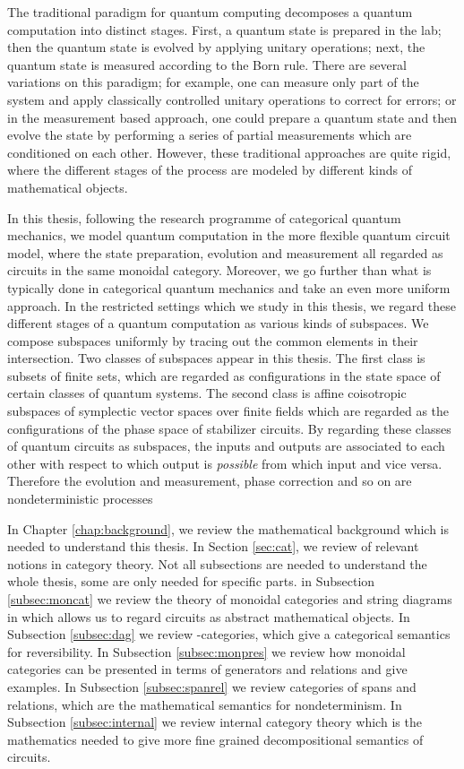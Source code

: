 
The traditional paradigm for quantum computing decomposes a quantum computation into  distinct stages. First, a quantum state is prepared in the lab; then the quantum state is evolved by applying unitary operations; next, the quantum state is measured according to the Born rule.  There are several variations on this paradigm; for example,  one can measure only part of the system and apply classically controlled unitary operations to correct for errors; or in the measurement based approach, one could prepare a quantum state and then evolve the state by performing a series of partial measurements which are conditioned on each other. However, these traditional approaches are quite rigid, where the different stages of the process are modeled by different kinds of mathematical objects.  %

In this thesis, following the research programme of categorical quantum mechanics, we model quantum computation in the more flexible quantum circuit model, where the state preparation, evolution and measurement all regarded as circuits in the same monoidal category. Moreover, we go further than what is typically done in  categorical quantum mechanics and  take an even more uniform approach.  In the restricted settings which we study in this thesis,  we regard these different stages of a quantum computation as various kinds of subspaces.  We compose subspaces uniformly by tracing out the common elements in their intersection.  Two classes of subspaces appear in this thesis. The first class is subsets of finite sets, which are regarded as configurations in the state space of certain classes of quantum systems.  The second class is affine coisotropic subspaces of symplectic vector spaces over finite fields which are regarded as the configurations of  the phase space of stabilizer circuits. By regarding these classes of quantum circuits as subspaces, the inputs and outputs are associated to each other with respect to which output is {\em possible} from which input and vice versa.  Therefore the evolution and measurement, phase correction and so on are nondeterministic processes

In Chapter \ref{chap:background}, we review the mathematical background which is needed to understand this thesis.   In Section \ref{sec:cat}, we review of relevant notions in category theory. Not all subsections are needed to understand the whole thesis, some are only needed for specific parts.  in Subsection \ref{subsec:moncat} we review the theory of monoidal categories and string diagrams in which allows us to regard circuits as abstract mathematical objects.  In Subsection \ref{subsec:dag} we review \dag-categories, which give a categorical semantics for reversibility. In Subsection \ref{subsec:monpres} we review how monoidal categories can be presented in terms of generators and relations and give examples.  In Subsection \ref{subsec:spanrel} we review categories of spans and relations, which are the mathematical semantics for  nondeterminism.  In Subsection \ref{subsec:internal} we review internal category theory which is the mathematics needed to give more fine grained decompositional semantics of circuits.  

